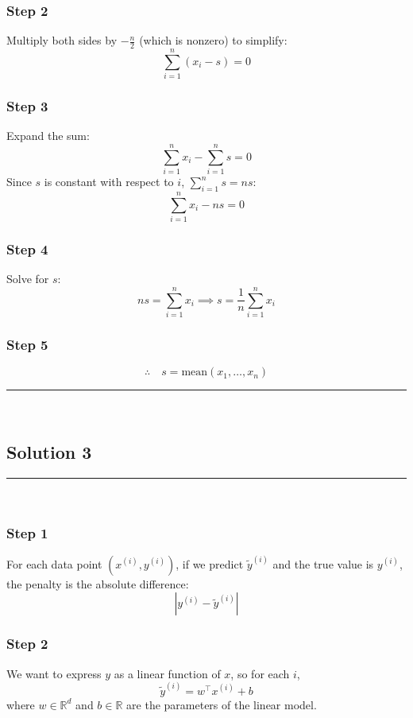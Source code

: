 \documentclass{article}
\begin{document}
\subsubsection*{Step 2}
\parbox{\textwidth}{
Multiply both sides by $-\frac{n}{2}$ (which is nonzero) to simplify:
\[
\sum_{i=1}^{n} (x_i - s) = 0
\]
}

\subsubsection*{Step 3}
\parbox{\textwidth}{
Expand the sum:
\[
\sum_{i=1}^{n} x_i - \sum_{i=1}^{n} s = 0
\]
Since $s$ is constant with respect to $i$, $\sum_{i=1}^{n} s = n s$:
\[
\sum_{i=1}^{n} x_i - n s = 0
\]
}

\subsubsection*{Step 4}
\parbox{\textwidth}{
Solve for $s$:
\[
n s = \sum_{i=1}^{n} x_i \implies s = \frac{1}{n} \sum_{i=1}^{n} x_i
\]
}

\subsubsection*{Step 5}
\parbox{\textwidth}{
\[
\therefore \quad s = \text{mean}(x_1, \ldots, x_n)
\]
}

\noindent\rule{\textwidth}{0.4pt}\\

\newpage


\subsection*{Solution 3}
\noindent\rule{\textwidth}{0.4pt}\\

\subsubsection*{Step 1}
\parbox{\textwidth}{
For each data point $(x^{(i)}, y^{(i)})$, if we predict $\widetilde{y}^{(i)}$ and the true value is $y^{(i)}$, the penalty is the absolute difference:
\[
|y^{(i)} - \widetilde{y}^{(i)}|
\]
}

\subsubsection*{Step 2}
\parbox{\textwidth}{
We want to express $y$ as a linear function of $x$, so for each $i$,
\[
\widetilde{y}^{(i)} = w^\top x^{(i)} + b
\]
where $w \in \mathbb{R}^d$ and $b \in \mathbb{R}$ are the parameters of the linear model.
}
\end{document}
